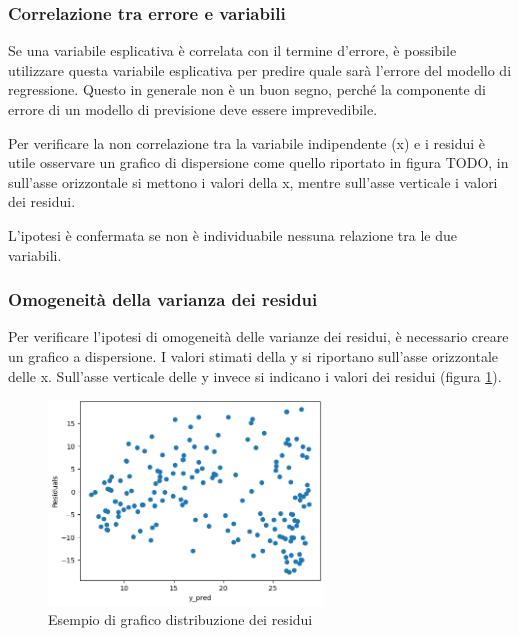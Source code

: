 \subsubsection{Correlazione tra errore e variabili}\label{ssec:correlazione-errore-variabili}
Se una variabile esplicativa è correlata con il termine d’errore, è possibile utilizzare questa variabile esplicativa per predire quale sarà l’errore del modello di regressione. Questo in generale non è un buon segno, perché la componente di errore di un modello di previsione deve essere imprevedibile.

Per verificare la non correlazione tra la variabile indipendente (x) e i residui è utile osservare un grafico di dispersione come quello riportato in figura TODO, in sull’asse orizzontale si mettono i valori della x, mentre sull’asse verticale i valori dei residui.


L’ipotesi è confermata se non è individuabile nessuna relazione tra le due variabili.

\subsubsection{Omogeneità della varianza dei residui}\label{ssec:omogeneita-varianza}
Per verificare l’ipotesi di omogeneità delle varianze dei residui, è necessario creare un grafico a dispersione.  I valori stimati della y si riportano sull’asse orizzontale delle x. Sull’asse verticale delle y invece si indicano i valori dei residui (figura \ref{fig:distr_residui}).

\begin{figure}[H]
\centering
\includegraphics[width=0.65\textwidth,height=\textheight,keepaspectratio]{img/distr_residui.png}
\caption{Esempio di grafico distribuzione dei residui}
\label{fig:distr_residui}
\end{figure}

